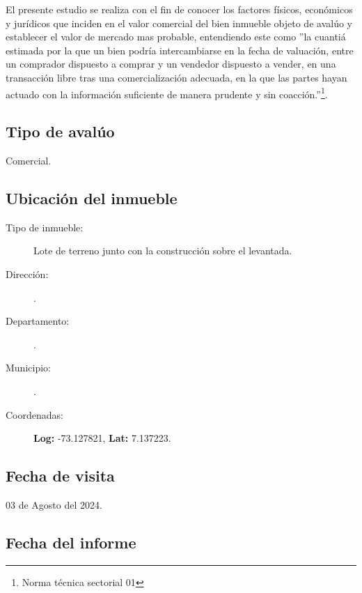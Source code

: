 \documentclass[12pt,a4paper,twoside]{article}
\begin{document}
{El presente estudio se realiza con el fin de conocer los factores físicos, económicos y jurídicos que inciden en el valor comercial del bien inmueble objeto de avalúo y establecer el valor de mercado mas probable, entendiendo este como ''la cuantiá estimada por la que un bien podría intercambiarse en la fecha de valuación, entre un comprador dispuesto a comprar y un vendedor dispuesto a vender, en una transacción libre tras una comercialización adecuada, en la que las partes hayan actuado con la información suficiente de manera prudente y sin coacción.''\footnote{Norma técnica sectorial 01}.

\subsection{Tipo de avalúo}

Comercial.

\subsection{Ubicación del inmueble}

\begin{description}
	
	\item[Tipo de inmueble: ] Lote de terreno junto con la construcción sobre el levantada.
	\item[Dirección: ] \Direccion.
	\item[Departamento: ] \Departamento.
	\item[Municipio: ] \Municipio.
	\item[Coordenadas: ] \textbf{Log:} 	
 -73.127821, \textbf{Lat:} 	
 7.137223. 
	
\end{description}
 
\subsection{Fecha de visita}
 
03 de Agosto del 2024.

\subsection{Fecha del informe}

}
\end{document}
